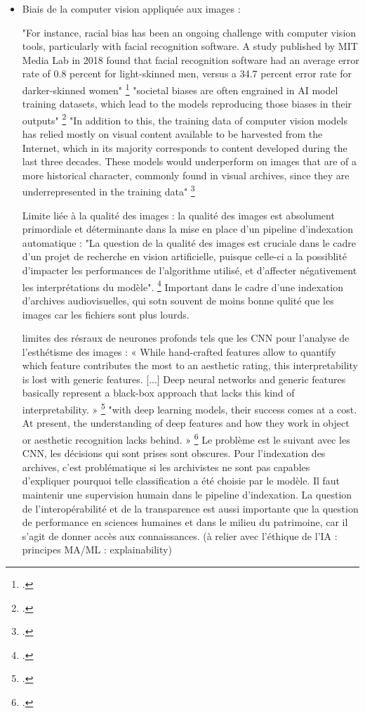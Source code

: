 \begin{itemize}
\item Biais de la computer vision appliquée aux images : 

"For instance, racial bias has been an ongoing challenge with	computer vision tools, particularly with facial recognition software. A study	published by MIT Media Lab in 2018 found that facial recognition software	had an average error rate of 0.8 percent for light-skinned men, versus a 34.7 percent	error rate for darker-skinned women" \footcite{fewster}
"societal biases are often engrained in	AI model training datasets, which lead to the models reproducing those	biases in their outputs" \footcite{fewster}
"In addition to this, the training data of computer	vision models has relied mostly on visual content available to be harvested	from the Internet, which in its majority corresponds to content developed	during the last three decades. These models would underperform on images	that are of a more historical character, commonly found in visual archives,	since they are underrepresented in the training data" \footcite{fewster}

Limite liée à la qualité des images : 
la qualité des images est absolument primordiale et déterminante dans la mise en place d'un pipeline d'indexation automatique : "La question de la qualité des images est
cruciale dans le cadre d’un projet de recherche en vision artificielle, puisque celle-ci a la possiblité d’impacter les performances de l’algorithme utilisé, et d’affecter négativement les interprétations du modèle". \footcite{norindr2023}
Important dans le cadre d'une indexation d'archives audiovisuelles, qui sotn souvent de moins bonne qulité que les images car les fichiers sont plus lourds.

limites des résraux de neurones profonds tels que les CNN pour l'analyse de l'esthétisme des images : « While hand-crafted features allow to quantify which feature contributes the most to an aesthetic rating, this interpretability is lost with generic features. [...] Deep neural networks and generic features basically represent a black-box approach that lacks this kind of interpretability. » \footcite{brachmann2017}
"with deep learning models, their success comes at a cost. At present, the understanding of deep features and how they work in object or aesthetic recognition lacks behind. » \footcite{brachmann2017}
Le problème est le suivant avec les CNN, les décisions qui sont prises sont obscures. Pour l'indexation des archives, c'est problématique si les archivistes ne sont pas capables d'expliquer pourquoi telle classification a été choisie par le modèle. Il faut maintenir une supervision humain dans le pipeline d'indexation. 
La question de l'interopérabilité et de la transparence est aussi importante que la question de performance en sciences humaines et dans le milieu du patrimoine, car il s'agit de donner accès aux connaissances. (à relier avec l'éthique de l'IA : principes MA/ML : explainability)


\end{itemize}
